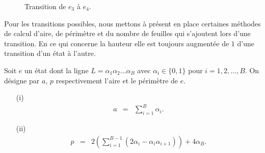 \begin{Ex}
\begin{itemize}
\begin{figure}[!htb]
\begin{minipage}[c]{.16\linewidth}
  \centering
\begin{logicpuzzle}[rows=2,columns=5,color=cyan!100, width=750px,scale=0.5]
\framepuzzle[black!50]
\end{logicpuzzle}
\end{minipage}
\hfill
\begin{minipage}[c]{.26\linewidth}
  \centering
\begin{logicpuzzle}[rows=2,columns=5,color=cyan!100, width=750px,scale=0.5]
\framepuzzle[black!50]
\end{logicpuzzle}
\end{minipage}
\hfill
\caption{\label{Atfig22229} Transition de $e_{3}$ à $e_{4}$.}
\end{figure}
\end{itemize}
\end{Ex}
Pour les transitions possibles, nous mettons à présent en place certaines méthodes de calcul d'aire, de périmètre et du nombre de feuilles qui s'ajoutent lors d'une transition. En ce qui concerne la hauteur elle est toujours augmentée de $1$  d'une transition d'un état à l'autre.
\begin{Prop}\label{prop4}
Soit  $e$ un état dont la ligne $L=\alpha_{1}\alpha_{2}...\alpha_{B}$ avec $\alpha_{i}\in \{0,1\}$ pour $i=1,2,...,B$. On désigne par $a$, $p$  respectivement l'aire et le périmètre de $e$.
\begin{itemize}
\item[(i)] 
\begin{eqnarray}
a & = & \sum_{i=1}^{B}\alpha_{i}.
\end{eqnarray}
\item[(ii)]
\begin{eqnarray}
p & = & 2\left(\sum_{i=1}^{B-1}(2\alpha_{i}-\alpha_{i}\alpha_{i+1})\right) + 4\alpha_{B}.
\end{eqnarray}
\end{itemize}
\end{Prop}
